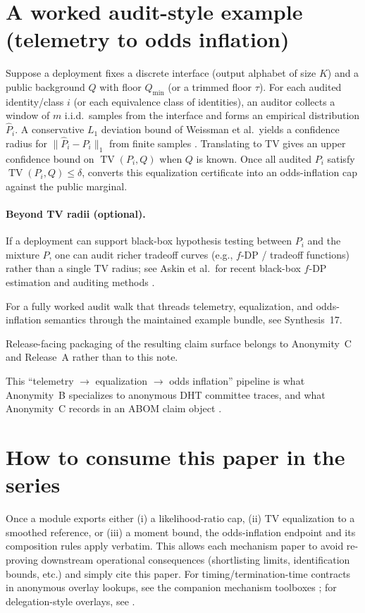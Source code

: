 \documentclass[11pt]{article}
\DeclareMathOperator{\TV}{TV}
\theoremstyle{definition}
\theoremstyle{remark}
\begin{document}
\section{A worked audit-style example (telemetry to odds inflation)}\label{sec:worked_example}
Suppose a deployment fixes a discrete interface (output alphabet of size $K$) and a public background $Q$ with floor $Q_{\min}$ (or a trimmed floor $\tau$).
For each audited identity/class $i$ (or each equivalence class of identities), an auditor collects a window of $m$ i.i.d.\ samples from the interface and forms an empirical distribution $\widehat P_i$.
A conservative $L_1$ deviation bound of Weissman et al.\ yields a confidence radius for $\|\widehat P_i-P_i\|_1$ from finite samples \cite{Weissman2003L1}.
Translating to TV gives an upper confidence bound on $\TV(P_i,Q)$ when $Q$ is known.
Once all audited $P_i$ satisfy $\TV(P_i,Q)\le\delta$,  converts this equalization certificate into an odds-inflation cap against the public marginal.

\paragraph{Beyond TV radii (optional).}
If a deployment can support black-box hypothesis testing between $P_i$ and the mixture $P$, one can audit richer tradeoff curves (e.g., $f$-DP / tradeoff functions) rather than a single TV radius; see Askin et al.\ for recent black-box $f$-DP estimation and auditing methods \cite{AskinUSENIXSecurity2025}.

For a fully worked audit walk that threads telemetry, equalization, and odds-inflation semantics through the maintained example bundle, see Synthesis~17.\cite{series:workedexample}

Release-facing packaging of the resulting claim surface belongs to Anonymity~C and Release~A rather than to this note.\cite{series:abomoinl,series:releaseA}

This ``telemetry $\rightarrow$ equalization $\rightarrow$ odds inflation'' pipeline is what Anonymity~B specializes to anonymous DHT committee traces, and what Anonymity~C records in an ABOM claim object \cite{series:profiling,series:abomoinl}.

\section{How to consume this paper in the series}
Once a module exports either (i) a likelihood-ratio cap, (ii) TV equalization to a smoothed reference, or (iii) a moment bound,
the odds-inflation endpoint and its composition rules apply verbatim.
This allows each mechanism paper to avoid re-proving downstream operational consequences (shortlisting limits, identification bounds, etc.) and simply cite this paper.
For timing/termination-time contracts in anonymous overlay lookups, see the companion mechanism toolboxes \cite{series:schedcompiler,series:prefixcapacities}; for delegation-style overlays, see \cite{series:spectral}.
\end{document}
